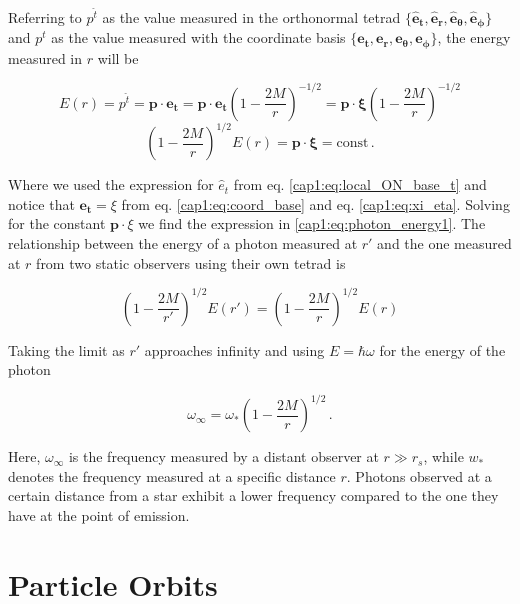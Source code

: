 Referring to $p^{\hat t}$ as the value measured in the orthonormal tetrad
$\{ \mathbf{\hat e_t, \hat e_r, \hat e_\theta, \hat e_\phi} \}$ and
$p^t$ as the value measured with the coordinate basis
$\{ \mathbf{e_{t}, e_{r}, e_{\theta}, e_{\phi}} \}$, the energy measured in $r$ will be

\begin{equation*}
    E(r) = p^{\hat t} = \mathbf{p \cdot \hat e_t}
    = \mathbf{p \cdot e_t} \left(1 - \frac{2M}{r} \right)^{-1/2}
    = \mathbf{p \cdot \xi} \left(1 - \frac{2M}{r} \right)^{-1/2}
\end{equation*}
\begin{equation}
    \left(1 - \frac{2M}{r} \right)^{1/2} E(r) = \mathbf{p \cdot \xi}
    = \text{const} \, .
    \label{cap1:eq:photon_energy1}
\end{equation}

Where we used the expression for $\hat e_t$ from eq.
\ref{cap1:eq:local_ON_base_t}
and notice that $\mathbf{e_t} = \xi$ from eq. \ref{cap1:eq:coord_base} and eq.
\ref{cap1:eq:xi_eta}. 
Solving for the constant $\mathbf{p} \cdot \xi$ we find the expression in
\ref{cap1:eq:photon_energy1}. The relationship between the energy of a photon
measured at $r'$ and the one measured at $r$ from two static observers using
their own tetrad is

\begin{equation*}
    \left(1 - \frac{2M}{r'} \right)^{1/2} E(r')
    = \left(1 - \frac{2M}{r} \right)^{1/2} E(r)
\end{equation*}

Taking the limit as $r'$ approaches infinity and using $E = \hbar \omega$ for
the energy of the photon

\begin{equation}
    \omega_\infty = \omega_* \left(1 - \frac{2M}{r} \right)^{1/2} \, .
    \label{cap1:eq:redshift}
\end{equation}

Here, $\omega_\infty$ is the frequency measured by a distant observer at
$r \gg r_s$, while $w_*$ denotes the frequency measured at a specific distance
$r$.
Photons observed at a certain distance from a star exhibit a lower frequency
compared to the one they have at the point of emission.


\section{Particle Orbits}
\label{cap1:sec:particle_orbits}

